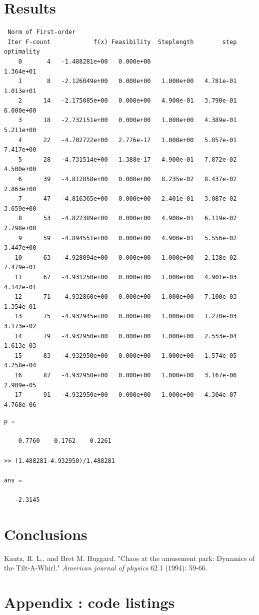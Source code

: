 \documentclass[11pt]{article}
\begin{document}
\section{Results}

\begin{verbatim}
 Norm of First-order
 Iter F-count            f(x) Feasibility  Steplength        step  optimality
    0       4   -1.488281e+00   0.000e+00                           1.364e+01
    1       8   -2.126049e+00   0.000e+00   1.000e+00   4.781e-01   1.013e+01
    2      14   -2.175085e+00   0.000e+00   4.900e-01   3.790e-01   6.000e+00
    3      18   -2.732151e+00   0.000e+00   1.000e+00   4.389e-01   5.211e+00
    4      22   -4.702722e+00   2.776e-17   1.000e+00   5.857e-01   7.417e+00
    5      28   -4.731514e+00   1.388e-17   4.900e-01   7.872e-02   4.500e+00
    6      39   -4.812858e+00   0.000e+00   8.235e-02   8.437e-02   2.863e+00
    7      47   -4.816365e+00   0.000e+00   2.401e-01   3.087e-02   3.659e+00
    8      53   -4.822389e+00   0.000e+00   4.900e-01   6.119e-02   2.798e+00
    9      59   -4.894551e+00   0.000e+00   4.900e-01   5.556e-02   3.447e+00
   10      63   -4.928094e+00   0.000e+00   1.000e+00   2.138e-02   7.479e-01
   11      67   -4.931250e+00   0.000e+00   1.000e+00   4.901e-03   4.142e-01
   12      71   -4.932860e+00   0.000e+00   1.000e+00   7.100e-03   1.354e-01
   13      75   -4.932945e+00   0.000e+00   1.000e+00   1.270e-03   3.173e-02
   14      79   -4.932950e+00   0.000e+00   1.000e+00   2.553e-04   1.613e-03
   15      83   -4.932950e+00   0.000e+00   1.000e+00   1.574e-05   4.258e-04
   16      87   -4.932950e+00   0.000e+00   1.000e+00   3.167e-06   2.909e-05
   17      91   -4.932950e+00   0.000e+00   1.000e+00   4.304e-07   4.768e-06
\end{verbatim}

\begin{verbatim}
p =

    0.7760    0.1762    0.2261

>> (1.488281-4.932950)/1.488281

ans =

   -2.3145
\end{verbatim}

\section{Conclusions}

\begin{thebibliography}{1}
 Kautz, R. L., and Bret M. Huggard.
"Chaos at the amusement park: Dynamics of the Tilt‐A‐Whirl."
\emph{American journal of physics} 62.1 (1994): 59-66.
\end{thebibliography}

\newpage

\section{Appendix : code listings}


\newpage

\newpage

\newpage

\end{document}
